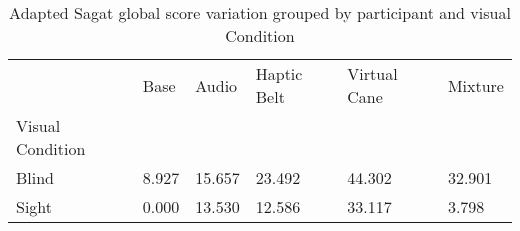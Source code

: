 
\begin{table}[!htb]
\centering
\caption{Adapted Sagat global score variation grouped by participant and visual Condition}
\label{tab:sagat_var_average_group}
\begin{tabular}{llllll}
\toprule
{} &  Base &  Audio &  Haptic Belt &  Virtual Cane &  Mixture \\
Visual Condition &       &        &              &               &          \\
\midrule
Blind            & 8.927 & 15.657 &       23.492 &        44.302 &   32.901 \\
Sight            & 0.000 & 13.530 &       12.586 &        33.117 &    3.798 \\
\bottomrule
\end{tabular}
\end{table}

